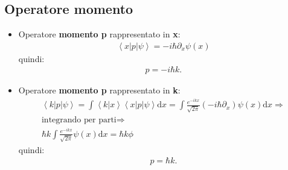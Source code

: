 \subsection{Operatore momento} %
\begin{itemize}
\item Operatore \textbf{momento p} rappresentato in \textbf{x}:
\begin{equation}\begin{split}
\left\langle x|p|\psi  \right\rangle=-i\hbar \partial _x\psi \left(x\right)
\end{split}\end{equation}
quindi:\begin{equation}\begin{split}
p=-i\hbar k.
\end{split}\end{equation}
\item Operatore \textbf{momento p} rappresentato in \textbf{k}:
\begin{equation}\begin{split}
\left\langle k|p|\psi  \right\rangle=\int{\left\langle k|x \right\rangle\left\langle x|p|\psi  \right\rangle\textrm{d}x}=\int{\frac{e^{-ikx}}{\sqrt{2\pi}}\left(-i\hbar \partial _x\right)\psi \left(x\right)\textrm{d}x} \Longrightarrow \\
\textrm{integrando per parti} \Longrightarrow \\
\hbar k\int{\frac{e^{-ikx}}{\sqrt{2\pi}}\psi \left(x\right) \textrm{d}x}=\hbar k\phi
\end{split}\end{equation}
quindi:\begin{equation}\begin{split}
p=\hbar k.
\end{split}\end{equation}
\end{itemize}

